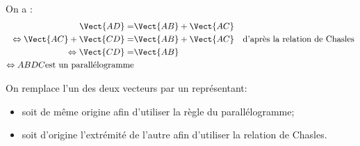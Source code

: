 \documentclass{book}
\begin{document}
\begin{Demonstration}
On a :
$$\begin{aligned}
\Vect{AD}=&\Vect{AB}+\Vect{AC}&\\
\Leftrightarrow \Vect{AC}+\Vect{CD}=&\Vect{AB}+\Vect{AC}&\text{d'après la relation de Chasles}\\
\Leftrightarrow \Vect{CD}=&\Vect{AB}\\
 \Leftrightarrow ABDC \text{est un parallélogramme} 
\end{aligned}$$
\end{Demonstration}


\begin{Methode}
On remplace l'un des deux vecteurs par un représentant: 
\begin{itemize}
\item soit de même origine afin d'utiliser la règle du parallélogramme;
\item soit d'origine l'extrémité de l'autre afin d'utiliser la relation de Chasles.
\end{itemize}
%
\end{Methode}
\end{document}
